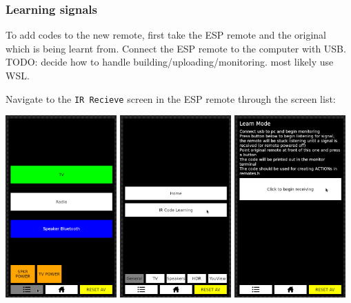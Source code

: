 \documentclass{article}
\begin{document}
\subsubsection{Learning signals}
To add codes to the new remote, first take the ESP remote and the original which is being learnt from. Connect the ESP
remote to the computer with USB. TODO: decide how to handle building/uploading/monitoring. most likely use WSL.

Navigate to the \verb|IR Recieve| screen in the ESP remote through the screen list:

\begin{center}
    \includegraphics[width=0.32\textwidth]{images/ir learn 1.png}
    \includegraphics[width=0.32\textwidth]{images/ir learn 2.png}
    \includegraphics[width=0.32\textwidth]{images/ir learn 3.png}
\end{center}
\end{document}
